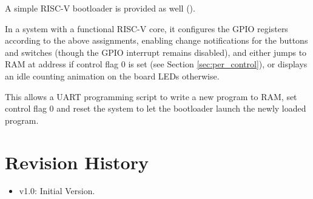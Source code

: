 A simple RISC-V bootloader is provided as well ().

In a system with a functional RISC-V core, it configures the GPIO registers according to the above assignments, enabling change notifications for the buttons and switches (though the GPIO interrupt remains disabled), and either jumps to RAM at address  if control flag 0 is set (see Section \ref{sec:per_control}), or displays an idle counting animation on the board LEDs otherwise.

This allows a UART programming script to write a new program to RAM, set control flag 0 and reset the system to let the bootloader launch the newly loaded program.

\newpage
\section{Revision History}\label{sec:revisions}
\begin{itemize}
    \item v1.0: Initial Version.
\end{itemize}
